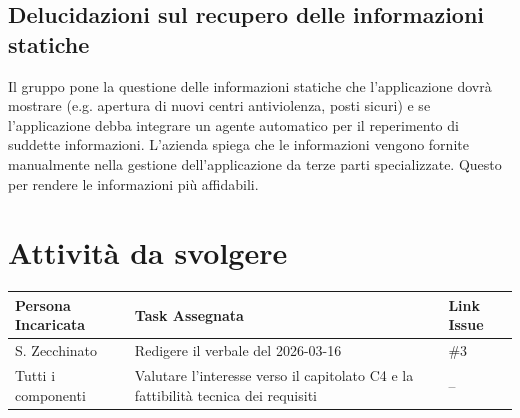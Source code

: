 \documentclass[a4paper, 10pt, colorlinks=true, linkcolor=black, urlcolor=blue, citecolor=blue, hidelinks]{article}
\begin{document}
\subsection{Delucidazioni sul recupero delle informazioni statiche}
Il gruppo pone la questione delle informazioni statiche che l'applicazione dovrà mostrare (e.g. apertura di nuovi centri antiviolenza, posti sicuri) e se l'applicazione debba integrare un agente automatico per il reperimento di suddette informazioni. L'azienda spiega che le informazioni vengono fornite manualmente nella gestione dell'applicazione da terze parti specializzate. Questo per rendere le informazioni più affidabili.

\section{Attività da svolgere}
\begin{center}
\renewcommand{\arraystretch}{1.4}
\begin{tabular}{|p{4.2cm}|p{6.2cm}|p{2.2cm}|}
\hline
\textbf{Persona Incaricata} & \textbf{Task Assegnata} & \centering\textbf{Link Issue} \tabularnewline
\hline
S. Zecchinato & Redigere il verbale del 2026-03-16 & \centering \#3 \tabularnewline
\hline
Tutti i componenti & Valutare l'interesse verso il capitolato C4 e la fattibilità tecnica dei requisiti & \centering -- \tabularnewline
\hline
\end{tabular}
\end{center}
\end{document}
